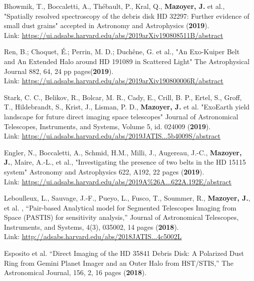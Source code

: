 \documentclass[11pt,a4paper, french]{article}
\begin{document}
\begin{etaremune}
\item Bhowmik, T., Boccaletti, A., Thébault, P., Kral, Q., \textbf{Mazoyer, J.} et al.,
"Spatially resolved spectroscopy of the debris disk HD 32297: Further evidence of small dust grains"
accepted in Astronomy and Astrophysics (\textbf{2019}).\\
Link: \textcolor{BrickRed}{\underline{\url{https://ui.adsabs.harvard.edu/abs/2019arXiv190808511B/abstract}}}
\item Ren, B.; Choquet, É.; Perrin, M. D.; Duchêne, G. et al., "An Exo-Kuiper Belt and An Extended Halo around HD 191089 in Scattered Light"
The Astrophysical Journal 882, 64, 24 pp pages(\textbf{2019}).\\
Link: \textcolor{BrickRed}{\underline{\url{https://ui.adsabs.harvard.edu/abs/2019arXiv190800006R/abstract}}}
\item Stark, C. C., Belikov, R., Bolcar, M. R., Cady, E., Crill, B. P., Ertel, S., Groff, T., Hildebrandt, S., Krist, J., Lisman, P. D., \textbf{Mazoyer, J.} et al.
"ExoEarth yield landscape for future direct imaging space telescopes"
Journal of Astronomical Telescopes, Instruments, and Systems, Volume 5, id. 024009 (\textbf{2019}).\\
Link: \textcolor{BrickRed}{\underline{\url{https://ui.adsabs.harvard.edu/abs/2019JATIS...5b4009S/abstract}}}
\item Engler, N., Boccaletti, A., Schmid, H.M., Milli, J., Augereau, J.-C., \textbf{Mazoyer, J.}, Maire, A.-L., et al., "Investigating the presence of two belts in the HD 15115 system"
Astronomy and Astrophysics 622, A192, 22 pages (\textbf{2019}).\\
Link: \textcolor{BrickRed}{\underline{\url{https://ui.adsabs.harvard.edu/abs/2019A\%26A...622A.192E/abstract}}}
\item Leboulleux, L., Sauvage, J.-F., Pueyo, L.,  Fusco, T., Soummer, R., \textbf{Mazoyer, J.}, et al. , “Pair-based Analytical model for Segmented Telescopes Imaging from Space (PASTIS) for sensitivity analysis,” Journal of Astronomical Telescopes, Instruments, and Systems, 4(3), 035002, 14 pages  (\textbf{2018}).\\
Link: \textcolor{BrickRed}{\underline{\url{http://adsabs.harvard.edu/abs/2018JATIS...4c5002L}}}
\item Esposito et al. “Direct Imaging of the HD 35841 Debris Disk: A Polarized Dust Ring from Gemini Planet Imager and an Outer Halo from HST/STIS,” The Astronomical Journal, 156, 2, 16 pages (\textbf{2018}).\\

\end{etaremune}
\end{document}
